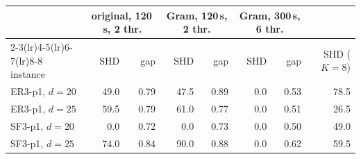 \begin{tabular}{l rr rr rr r}
\toprule
 & \multicolumn{2}{c}{original, 120\,s, 2 thr.} & \multicolumn{2}{c}{Gram, 120\,s, 2 thr.} & \multicolumn{2}{c}{Gram, 300\,s, 6 thr.} & \feddbn{} \\
\cmidrule(lr){2-3}\cmidrule(lr){4-5}\cmidrule(lr){6-7}\cmidrule(lr){8-8}
instance & SHD & gap & SHD & gap & SHD & gap & SHD ($K{=}8$) \\
\midrule
ER3-p1, $d=20$ & 49.0 & 0.79 & 47.5 & 0.89 & 0.0 & 0.53 & 78.5 \\
ER3-p1, $d=25$ & 59.5 & 0.79 & 61.0 & 0.77 & 0.0 & 0.51 & 26.5 \\
SF3-p1, $d=20$ & 0.0 & 0.72 & 0.0 & 0.73 & 0.0 & 0.50 & 49.0 \\
SF3-p1, $d=25$ & 74.0 & 0.84 & 90.0 & 0.88 & 0.0 & 0.62 & 59.5 \\
\bottomrule
\end{tabular}
